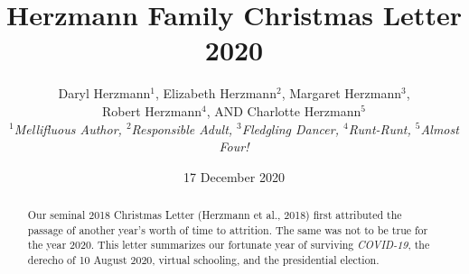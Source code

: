 \documentclass[letterpaper,11pt]{article}
\title{\vspace{-2.0cm}Herzmann Family Christmas Letter 2020}
\author{Daryl Herzmann${}^1$, Elizabeth Herzmann${}^2$, Margaret 
Herzmann${}^3$,\\
Robert Herzmann${}^4$, AND Charlotte Herzmann${}^5$ \\
\it{${}^1$Mellifluous Author},
\it{${}^2$Responsible Adult},
\it{${}^3$Fledgling Dancer},
\it{${}^4$Runt-Runt},
\it{${}^5$Almost Four!}}
\date{17 December 2020}
\begin{document}
\maketitle
\vspace{-0.75cm}
\begin{abstract}
Our seminal 2018 Christmas Letter (Herzmann et al., 2018) first attributed the passage
of another year's worth of time to attrition.  The same was not to be true for the
year 2020.  This letter summarizes our fortunate year of surviving \textit{COVID-19},
the derecho of 10 August 2020, virtual schooling, and the presidential election.
\end{abstract}

\vspace{-0.5cm}

\noindent\makebox[\linewidth]{\rule{\textwidth}{1pt}}
\end{document}
